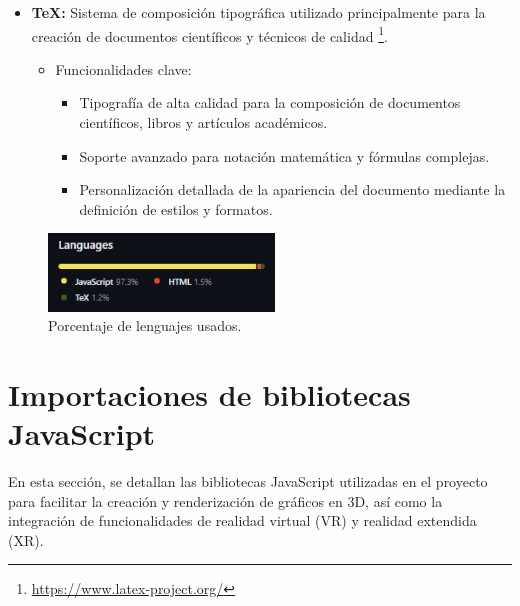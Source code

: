\documentclass[a4paper, 12pt]{book}
\begin{document}
\begin{itemize}
  \item \textbf{TeX:} Sistema de composición tipográfica utilizado principalmente para la creación de documentos científicos y técnicos de calidad
  \footnote{\url{https://www.latex-project.org/}}.
    \begin{itemize}
        \item Funcionalidades clave:
        \begin{itemize}
            \item Tipografía de alta calidad para la composición de documentos científicos, libros y artículos académicos.
            \item Soporte avanzado para notación matemática y fórmulas complejas.
            \item Personalización detallada de la apariencia del documento mediante la definición de estilos y formatos.
        \end{itemize}
    \end{itemize}
\end{itemize}

\begin{figure}
  \centering
  \includegraphics[width=6cm, keepaspectratio]{img/lenguajes.png}
  \caption{Porcentaje de lenguajes usados.}
  \label{fig:lenguajes}
\end{figure}


\section{Importaciones de bibliotecas JavaScript} 
\label{sec:importaciones}

En esta sección, se detallan las bibliotecas JavaScript utilizadas en el proyecto para facilitar la creación y renderización de gráficos en 3D, 
así como la integración de funcionalidades de realidad virtual (VR) y realidad extendida (XR).
\end{document}
